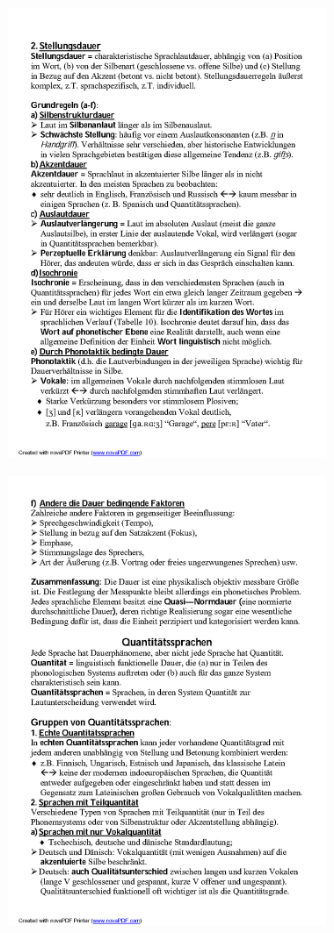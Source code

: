\documentclass[
  letterpaper,
]{scrbook}
\begin{document}
\includegraphics[width=3.31in,height=\textheight]{./pictures/prosodie/06_Prosodie_Folie_2005-06_R_Page13.png}

\includegraphics[width=3.31in,height=\textheight]{./pictures/prosodie/06_Prosodie_Folie_2005-06_R_Page14.png}
\end{document}
